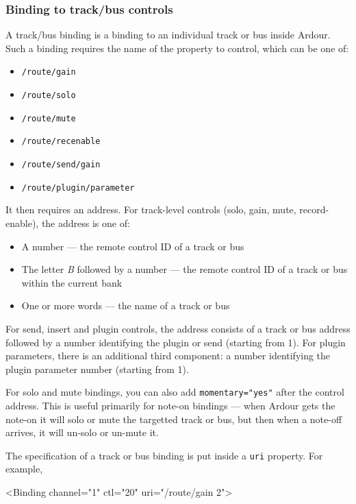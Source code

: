\documentclass[10pt,a4paper]{book}
\begin{document}
{\subsubsection{Binding to track/bus controls}

A track/bus binding is a binding to an individual track or bus inside
Ardour.  Such a binding requires the name of the property to control,
which can be one of:

\begin{itemize}
\item \texttt{/route/gain}
\item \texttt{/route/solo}
\item \texttt{/route/mute}
\item \texttt{/route/recenable}
\item \texttt{/route/send/gain}
\item \texttt{/route/plugin/parameter}
\end{itemize}

It then requires an address.  For track-level controls (solo, gain, mute, record-enable), the address is one of:

\begin{itemize}
\item A number --- the remote control ID of a track or bus
\item The letter \emph{B} followed by a number --- the remote control ID of a track or bus within the current bank
\item One or more words --- the name of a track or bus
\end{itemize}

For send, insert and plugin controls, the address consists of a track
or bus address followed by a number identifying the plugin or send
(starting from 1).  For plugin parameters, there is an additional third
component: a number identifying the plugin parameter number (starting
from 1).

For solo and mute bindings, you can also add \texttt{momentary="yes"} after the
control address. This is useful primarily for note-on bindings --- when
Ardour gets the note-on it will solo or mute the targetted track or
bus, but then when a note-off arrives, it will un-solo or un-mute it.

The specification of a track or bus binding is put inside a \texttt{uri} property.  For example,

\begin{listing}
<Binding channel="1" ctl="20" uri="/route/gain 2">
\end{listing}

}
\end{document}
